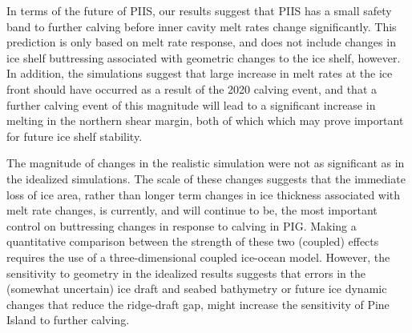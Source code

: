 \documentclass[draft]{agujournal2019}
\begin{document}
In terms of the future of PIIS, our results suggest that PIIS has a small safety band to further calving before inner cavity melt rates change significantly. This prediction is only based on melt rate response, and does not include changes in ice shelf buttressing associated with geometric changes to the ice shelf, however. In addition, the simulations suggest that large increase in melt rates at the ice front should have occurred as a result of the 2020 calving event, and that a further calving event of this magnitude will lead to a significant increase in melting in the northern shear margin, both of which which may prove important for future ice shelf stability.

The magnitude of changes in the realistic simulation were not as significant as in the idealized simulations. The scale of these changes suggests that the immediate loss of ice area, rather than longer term changes in ice thickness associated with melt rate changes, is currently, and will continue to be, the most important control on buttressing changes in response to calving in PIG. Making a quantitative comparison between the strength of these two (coupled) effects requires the use of a three-dimensional coupled ice-ocean model. However, the sensitivity to geometry in the idealized results suggests that errors in the (somewhat uncertain) ice draft and seabed bathymetry or future ice dynamic changes that reduce the ridge-draft gap, might increase the sensitivity of Pine Island to further calving.

%


%
%
%
%
\end{document}

